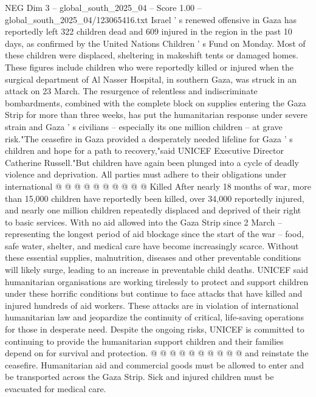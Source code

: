 \begin{textsample}{NEG Dim 3 – global\_south\_2025\_04 – Score 1.00 – global\_south\_2025\_04/123065416.txt}  \label{ex:f3_neg_340}
Israel ' s renewed offensive in Gaza has reportedly left 322 children dead and 609 injured in the region in the past 10 days, as confirmed by the United Nations Children ' s Fund on Monday.
Most of these children were displaced, sheltering in makeshift tents or damaged homes.
These figures include children who were reportedly killed or injured when the surgical department of Al Nasser Hospital, in southern Gaza, was struck in an attack on 23 March.
The resurgence of relentless and indiscriminate bombardments, combined with the complete block on supplies entering the Gaza Strip for more than three weeks, has put the humanitarian response under severe strain and Gaza ' s civilians -- especially its one million children -- at grave risk."The ceasefire in Gaza provided a desperately needed lifeline for Gaza ' s children and hope for a path to recovery,"said UNICEF Executive Director Catherine Russell."But children have again been plunged into a cycle of deadly violence and deprivation.
All parties must adhere to their obligations under international @ @ @ @ @ @ @ @ @ @ Killed After nearly 18 months of war, more than 15,000 children have reportedly been killed, over 34,000 reportedly injured, and nearly one million children repeatedly displaced and deprived of their right to basic services.
With no aid allowed into the Gaza Strip since 2 March -- representing the longest period of aid blockage since the start of the war -- food, safe water, shelter, and medical care have become increasingly scarce.
Without these essential supplies, malnutrition, diseases and other preventable conditions will likely surge, leading to an increase in preventable child deaths.
UNICEF said humanitarian organisations are working tirelessly to protect and support children under these horrific conditions but continue to face attacks that have killed and injured hundreds of aid workers.
These attacks are in violation of international humanitarian law and jeopardize the continuity of critical, life-saving operations for those in desperate need.
Despite the ongoing risks, UNICEF is committed to continuing to provide the humanitarian support children and their families depend on for survival and protection. @ @ @ @ @ @ @ @ @ @ and reinstate the ceasefire.
Humanitarian aid and commercial goods must be allowed to enter and be transported across the Gaza Strip.
Sick and injured children must be evacuated for medical care.

\end{textsample}
